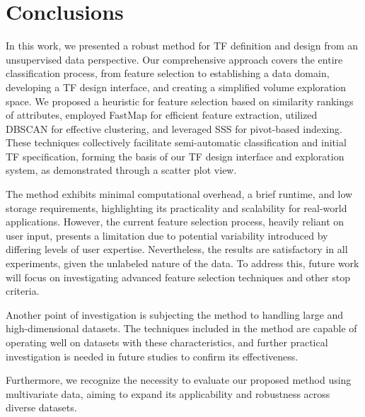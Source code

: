 \section{Conclusions}
\label{sect:conclusions}
In this work, we presented a robust method for TF definition and design from an unsupervised data perspective. Our comprehensive approach covers the entire classification process, from feature selection to establishing a data domain, developing a TF design interface, and creating a simplified volume exploration space. We proposed a heuristic for feature selection based on similarity rankings of attributes,  employed FastMap for efficient feature extraction, utilized DBSCAN for effective clustering, and leveraged SSS for pivot-based indexing. These techniques collectively facilitate semi-automatic classification and initial TF specification, forming the basis of our TF design interface and exploration system, as demonstrated through a scatter plot view.

The method exhibits minimal computational overhead, a brief runtime, and low storage requirements, highlighting its practicality and scalability for real-world applications. However, the current feature selection process, heavily reliant on user input, presents a limitation due to potential variability introduced by differing levels of user expertise. Nevertheless, the results are satisfactory in all experiments, given the unlabeled nature of the data. To address this, future work will focus on investigating advanced feature selection techniques and other stop criteria.

Another point of investigation is subjecting the method to handling large and high-dimensional datasets. The techniques included in the method are capable of operating well on datasets with these characteristics, and further practical investigation is needed in future studies to confirm its effectiveness.

Furthermore, we recognize the necessity to evaluate our proposed method using multivariate data, aiming to expand its applicability and robustness across diverse datasets.